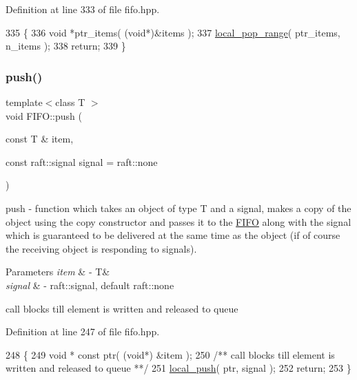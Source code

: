 Definition at line 333 of file fifo.\+hpp.


\begin{DoxyCode}
335    \{
336       \textcolor{keywordtype}{void} *ptr\_items( (\textcolor{keywordtype}{void}*)&items );
337       \hyperlink{class_f_i_f_o_ab57165cd95da922e5432577893ab2e28}{local\_pop\_range}( ptr\_items, n\_items );
338       \textcolor{keywordflow}{return};
339    \}
\end{DoxyCode}
\hypertarget{class_f_i_f_o_a381974271d6c818473edd23c355f0d36}{}\label{class_f_i_f_o_a381974271d6c818473edd23c355f0d36} 
\subsubsection{\texorpdfstring{push()}{push()}\hspace{0.1cm}{\footnotesize\ttfamily [1/2]}}
{\footnotesize\ttfamily template$<$class T $>$ \\
void F\+I\+F\+O\+::push (\begin{DoxyParamCaption}\item[{const T \&}]{item,  }\item[{const raft\+::signal}]{signal = {\ttfamily raft\+:\+:none} }\end{DoxyParamCaption})\hspace{0.3cm}{\ttfamily [inline]}}

push -\/ function which takes an object of type T and a signal, makes a copy of the object using the copy constructor and passes it to the \hyperlink{class_f_i_f_o}{F\+I\+FO} along with the signal which is guaranteed to be delivered at the same time as the object (if of course the receiving object is responding to signals). 
\begin{DoxyParams}{Parameters}
{\em item} & -\/ T\& \\
\hline
{\em signal} & -\/ raft\+::signal, default raft\+::none \\
\hline
\end{DoxyParams}
call blocks till element is written and released to queue 

Definition at line 247 of file fifo.\+hpp.


\begin{DoxyCode}
248    \{
249       \textcolor{keywordtype}{void} * \textcolor{keyword}{const} ptr( (\textcolor{keywordtype}{void}*) &item );\textcolor{comment}{}
250 \textcolor{comment}{      /** call blocks till element is written and released to queue **/}
251       \hyperlink{class_f_i_f_o_a4ef48ce2cb02e8bd5d381bb65687e6cb}{local\_push}( ptr, signal );
252       \textcolor{keywordflow}{return};
253    \}
\end{DoxyCode}
\hypertarget{class_f_i_f_o_ad1237dfa071d0ca2002bd5aa0ce6d203}{}\label{class_f_i_f_o_ad1237dfa071d0ca2002bd5aa0ce6d203} 
